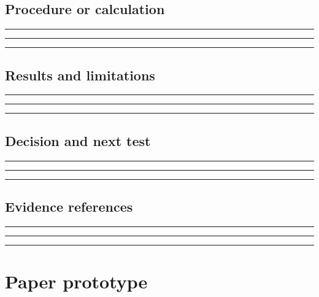\documentclass[11pt]{article}
\begin{document}
\subsection{Procedure or calculation}
\noindent\rule{\linewidth}{0.35pt}\par\vspace{0.22in}
\noindent\rule{\linewidth}{0.35pt}\par\vspace{0.22in}
\noindent\rule{\linewidth}{0.35pt}\par\vspace{0.18in}

\subsection{Results and limitations}
\noindent\rule{\linewidth}{0.35pt}\par\vspace{0.22in}
\noindent\rule{\linewidth}{0.35pt}\par\vspace{0.22in}
\noindent\rule{\linewidth}{0.35pt}\par\vspace{0.18in}

\subsection{Decision and next test}
\noindent\rule{\linewidth}{0.35pt}\par\vspace{0.22in}
\noindent\rule{\linewidth}{0.35pt}\par\vspace{0.22in}
\noindent\rule{\linewidth}{0.35pt}\par\vspace{0.18in}

\subsection{Evidence references}
\noindent\rule{\linewidth}{0.35pt}\par\vspace{0.22in}
\noindent\rule{\linewidth}{0.35pt}\par\vspace{0.22in}
\noindent\rule{\linewidth}{0.35pt}\par\vspace{0.18in}
\clearpage

\section{Paper prototype}
\end{document}

